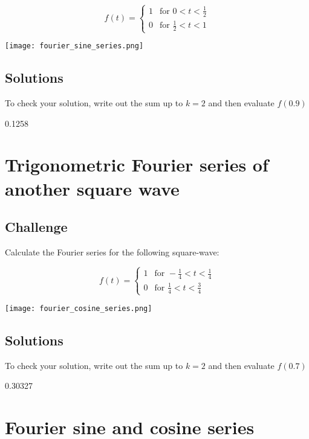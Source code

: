 \begin{equation}
   f(t) =
   \begin{cases}
       1 & \text{for } 0 < t < \frac{1}{2} \\
       0 & \text{for } \frac{1}{2} < t < 1
   \end{cases} 
\end{equation}

\texttt{[image: fourier\_sine\_series.png]}

\subsection*{Solutions}
To check your solution, write out the sum up to $k=2$ and then evaluate $f(0.9)$

0.1258



\newpage
\section{Trigonometric Fourier series of another square wave}
\label{sec:2ndsqwch}

\subsection*{Challenge}
Calculate the Fourier series for the following square-wave:

\begin{equation}
   f(t) =
   \begin{cases}
       1 & \text{for } -\frac{1}{4} < t < \frac{1}{4} \\
       0 & \text{for } \frac{1}{4} < t <\frac{3}{4} 
   \end{cases} 
\end{equation}

\texttt{[image: fourier\_cosine\_series.png]}

\subsection*{Solutions}
To check your solution, write out the sum up to $k=2$ and then evaluate $f(0.7)$

0.30327




\newpage
\section{Fourier sine and cosine series}

